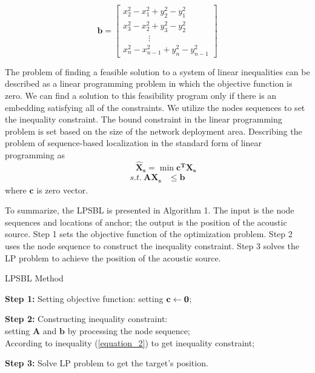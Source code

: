 \[\bm {b}=
\left[
\begin{array}{lcr}
x_2^2-x_1^2+y_2^2-y_1^2 \\
x_3^2-x_2^2+y_3^2-y_2^2 \\
  \quad \quad \quad  \vdots \\
x_n^2-x_{n-1}^2+y_n^2-y_{n-1}^2
\end{array}
\right]
\]


The problem of finding a feasible solution to a system of linear inequalities can be described as a linear programming problem in which the objective function is zero. 
We can find a solution to this feasibility program only if there is an embedding satisfying all of the constraints. 
We utilize the nodes sequences to set the inequality constraint.
The bound constraint in the linear programming problem is set based on the size of the network deployment area.
Describing the problem of sequence-based localization in the standard form of linear programming as
 \begin{equation} \label{6}
 \quad \quad \bm {\hat X_s} = \min {\bm{c^T}\bm{X_s}}
  \end{equation}
\begin{align*}
 s.t. \   \bm {{A}{X_s}} &\le \bm {b} 
\end{align*}
where $\bm {c}$ is zero vector.

To summarize, the LPSBL is presented in Algorithm 1. 
The input is the node sequences and locations of anchor; the output is the position of the acoustic source. 
Step 1 sets the objective function of the optimization problem. 
Step 2 uses the node sequence to construct the inequality constraint. 
Step 3 solves the LP problem to achieve the position of the acoustic source.
\begin{algorithm}
\caption{LPSBL Method}

\textbf{Step 1:} Setting objective function: setting $\bf{c} \leftarrow \bf{0}$;

\textbf{Step 2:} Constructing inequality constraint: \\ 
\hspace{0.41in} setting $\bm{A}$ and $\bm{b}$ by processing the node sequence;\\
{
{
According to inequality (\ref{equation_2}) to get inequality constraint;
}
}

\textbf{Step 3:} Solve LP problem to get the target's position.

\end{algorithm}


